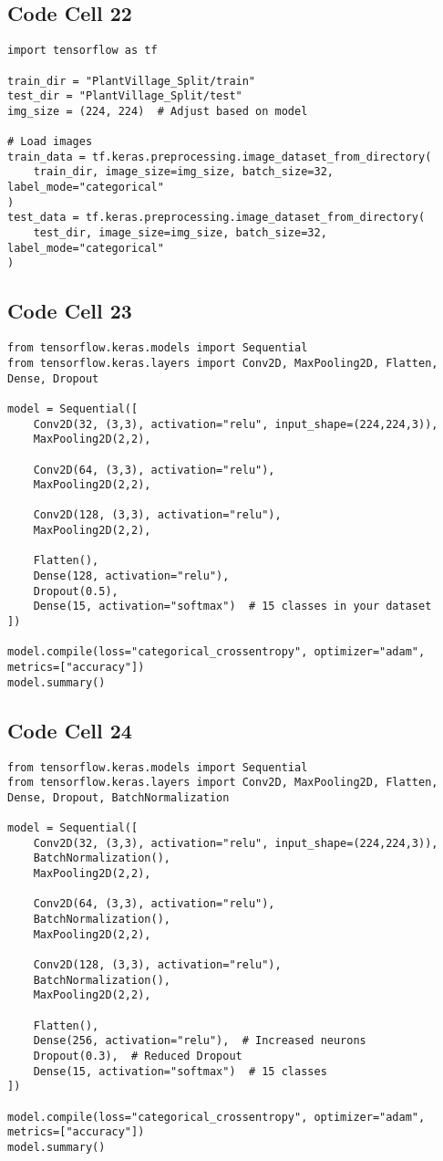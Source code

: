 \documentclass{article}
\begin{document}
\subsection*{Code Cell 22}
\begin{lstlisting}
import tensorflow as tf

train_dir = "PlantVillage_Split/train"
test_dir = "PlantVillage_Split/test"
img_size = (224, 224)  # Adjust based on model

# Load images
train_data = tf.keras.preprocessing.image_dataset_from_directory(
    train_dir, image_size=img_size, batch_size=32, label_mode="categorical"
)
test_data = tf.keras.preprocessing.image_dataset_from_directory(
    test_dir, image_size=img_size, batch_size=32, label_mode="categorical"
)
\end{lstlisting}

\subsection*{Code Cell 23}
\begin{lstlisting}
from tensorflow.keras.models import Sequential
from tensorflow.keras.layers import Conv2D, MaxPooling2D, Flatten, Dense, Dropout

model = Sequential([
    Conv2D(32, (3,3), activation="relu", input_shape=(224,224,3)),
    MaxPooling2D(2,2),

    Conv2D(64, (3,3), activation="relu"),
    MaxPooling2D(2,2),

    Conv2D(128, (3,3), activation="relu"),
    MaxPooling2D(2,2),

    Flatten(),
    Dense(128, activation="relu"),
    Dropout(0.5),
    Dense(15, activation="softmax")  # 15 classes in your dataset
])

model.compile(loss="categorical_crossentropy", optimizer="adam", metrics=["accuracy"])
model.summary()
\end{lstlisting}

\subsection*{Code Cell 24}
\begin{lstlisting}
from tensorflow.keras.models import Sequential
from tensorflow.keras.layers import Conv2D, MaxPooling2D, Flatten, Dense, Dropout, BatchNormalization

model = Sequential([
    Conv2D(32, (3,3), activation="relu", input_shape=(224,224,3)),
    BatchNormalization(),
    MaxPooling2D(2,2),

    Conv2D(64, (3,3), activation="relu"),
    BatchNormalization(),
    MaxPooling2D(2,2),

    Conv2D(128, (3,3), activation="relu"),
    BatchNormalization(),
    MaxPooling2D(2,2),

    Flatten(),
    Dense(256, activation="relu"),  # Increased neurons
    Dropout(0.3),  # Reduced Dropout
    Dense(15, activation="softmax")  # 15 classes
])

model.compile(loss="categorical_crossentropy", optimizer="adam", metrics=["accuracy"])
model.summary()

\end{lstlisting}
\end{document}
